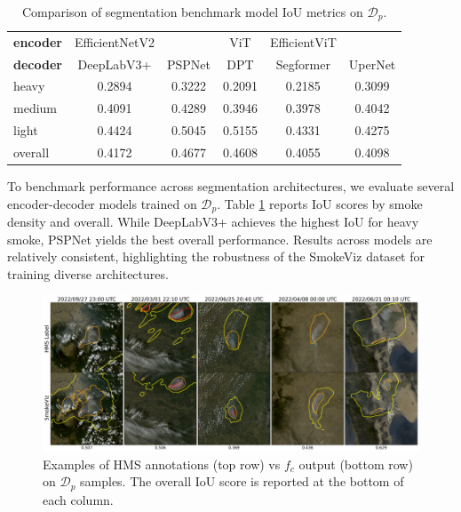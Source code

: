 \documentclass{article}
\begin{document}
\begin{table}[!htb] 
    \caption{Comparison of segmentation benchmark model IoU metrics on \(\mathcal{D}_{p}\).}\label{bench}
    \centering
    \begin{tabular}{lccccc}
        \toprule
        \textbf{encoder} & EfficientNetV2 \cite{efficientnetv2} & \cite{efficientnetv2} & ViT \cite{vit} & EfficientViT \cite{efficientvit} & \cite{efficientvit}\\
        \textbf{decoder} & DeepLabV3+ \cite{deeplab} & PSPNet \cite{pspnet} & DPT \cite{dpt} & Segformer \cite{segformer} & UperNet \cite{upernet}\\
        \midrule
        heavy   & 0.2894 & 0.3222 & 0.2091 & 0.2185 & 0.3099 \\
        medium  & 0.4091 & 0.4289 & 0.3946 & 0.3978 & 0.4042 \\
        light   & 0.4424 & 0.5045 & 0.5155 & 0.4331 & 0.4275 \\
        overall & 0.4172 & 0.4677 & 0.4608 & 0.4055 & 0.4098 \\
        \bottomrule
    \end{tabular}
\end{table}

To benchmark performance across segmentation architectures, we evaluate several encoder-decoder models trained on \(\mathcal{D}_p\). Table \ref{bench} reports IoU scores by smoke density and overall. While DeepLabV3+ achieves the highest IoU for heavy smoke, PSPNet yields the best overall performance. Results across models are relatively consistent, highlighting the robustness of the SmokeViz dataset for training diverse architectures.

\begin{figure}[!htb]
    \centering
    \includegraphics[width=\linewidth]{figures/examples_small.png}
    \caption{Examples of HMS annotations (top row) vs \(f_{c}\) output (bottom row) on \(\mathcal{D}_{p}\) samples. The overall IoU score is reported at the bottom of each column.}\label{examples}
\end{figure}
\end{document}
